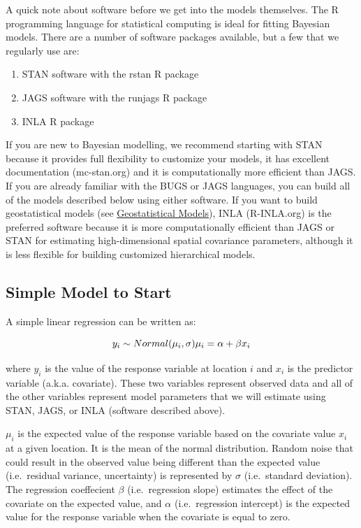 \documentclass[]{book}
\providecommand{\tightlist}{%
  \setlength{\itemsep}{0pt}\setlength{\parskip}{0pt}}
\begin{document}
A quick note about software before we get into the models themselves.
The R programming language for statistical computing \citep{r2020r} is
ideal for fitting Bayesian models. There are a number of software
packages available, but a few that we regularly use are:

\begin{enumerate}
\def\labelenumi{\arabic{enumi}.}
\tightlist
\item
  STAN software \citep{carpenter2017stan} with the rstan R package
  \citep{stan2020rstan}\\
\item
  JAGS software \citep{plummer2003jags} with the runjags R package
  \citep{denwood2016runjags}\\
\item
  INLA R package \citep{lindgren2015bayesian}
\end{enumerate}

If you are new to Bayesian modelling, we recommend starting with STAN
because it provides full flexibility to customize your models, it has
excellent documentation (mc-stan.org) and it is computationally more
efficient than JAGS. If you are already familiar with the BUGS or JAGS
languages, you can build all of the models described below using either
software. If you want to build geostatistical models (see
\protect\hyperlink{geostatistical-models}{Geostatistical Models}), INLA
(R-INLA.org) is the preferred software because it is more
computationally efficient than JAGS or STAN for estimating
high-dimensional spatial covariance parameters, although it is less
flexible for building customized hierarchical models.

\subsection{Simple Model to Start}\label{simple-model-to-start}

A simple linear regression can be written as:

\[
y_i \sim Normal(\mu_i, \sigma) \\
\mu_i = \alpha + \beta x_i
\]

where \(y_i\) is the value of the response variable at location \(i\)
and \(x_i\) is the predictor variable (a.k.a. covariate). These two
variables represent observed data and all of the other variables
represent model parameters that we will estimate using STAN, JAGS, or
INLA (software described above).

\(\mu_i\) is the expected value of the response variable based on the
covariate value \(x_i\) at a given location. It is the mean of the
normal distribution. Random noise that could result in the observed
value being different than the expected value (i.e.~residual variance,
uncertainty) is represented by \(\sigma\) (i.e.~standard deviation). The
regression coeffecient \(\beta\) (i.e.~regression slope) estimates the
effect of the covariate on the expected value, and \(\alpha\)
(i.e.~regression intercept) is the expected value for the response
variable when the covariate is equal to zero.
\end{document}
